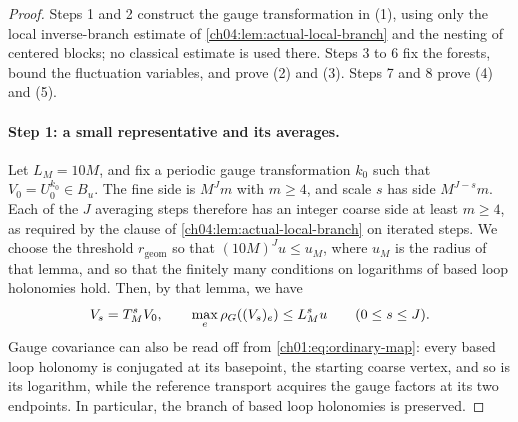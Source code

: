 \begin{proof}
Steps 1 and 2 construct the gauge transformation in (1), using only the local inverse-branch estimate of \cref{ch04:lem:actual-local-branch} and the nesting of centered blocks; no classical estimate is used there. Steps 3 to 6 fix the forests, bound the fluctuation variables, and prove (2) and (3). Steps 7 and 8 prove (4) and (5).

\paragraph{Step 1: a small representative and its averages.}
Let $L_M=10M$, and fix a periodic gauge transformation $k_0$ such that $V_0=U_0^{k_0}\in B_u$. The fine side is $M^Jm$ with $m\ge4$, and scale $s$ has side $M^{J-s}m$. Each of the $J$ averaging steps therefore has an integer coarse side at least $m\ge4$, as required by the clause of \cref{ch04:lem:actual-local-branch} on iterated steps. We choose the threshold $r_{\mathrm{geom}}$ so that $(10M)^Ju\le u_M$, where $u_M$ is the radius of that lemma, and so that the finitely many conditions on logarithms of based loop holonomies hold. Then, by that lemma, we have
\[
 V_s=T_M^sV_0,\qquad \max_e\rho_G((V_s)_e)\le L_M^su\qquad(0\le s\le J).
\]
Gauge covariance can also be read off from \eqref{ch01:eq:ordinary-map}: every based loop holonomy is conjugated at its basepoint, the starting coarse vertex, and so is its logarithm, while the reference transport acquires the gauge factors at its two endpoints. In particular, the branch of based loop holonomies is preserved.


\end{proof}
